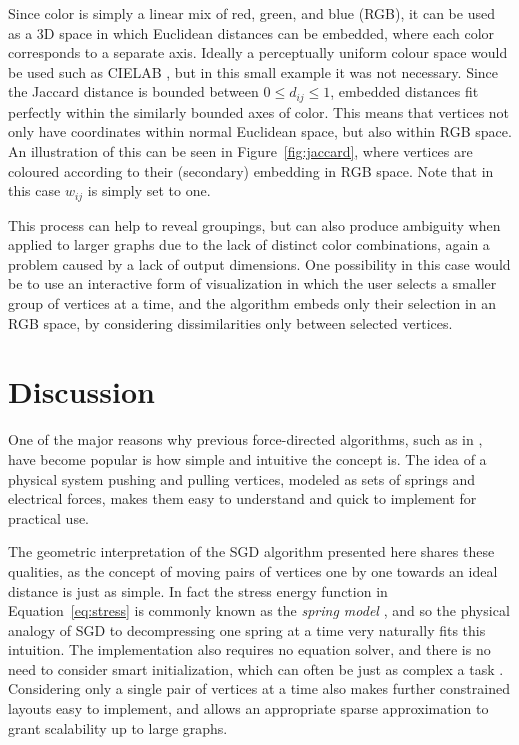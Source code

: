 Since color is simply a linear mix of red, green, and blue (RGB), it can be used as a 3D space in which Euclidean distances can be embedded, where each color corresponds to a separate axis. Ideally a perceptually uniform colour space would be used such as CIELAB \cite{Smart2019}, but in this small example it was not necessary.
Since the Jaccard distance is bounded between $0\leq d_{ij}\leq 1$, embedded distances fit perfectly within the similarly bounded axes of color. This means that vertices not only have coordinates within normal Euclidean space, but also within RGB space. 
An illustration of this can be seen in Figure~\ref{fig:jaccard}, where vertices are coloured according to their (secondary) embedding in RGB space. Note that in this case $w_{ij}$ is simply set to one.

This process can help to reveal groupings, but can also produce ambiguity when applied to larger graphs due to the lack of distinct color combinations, again a problem caused by a lack of output dimensions. One possibility in this case would be to use an interactive form of visualization in which the user selects a smaller group of vertices at a time, and the algorithm embeds only their selection in an RGB space, by considering dissimilarities only between selected vertices.

\section{Discussion}
One of the major reasons why previous force-directed algorithms, such as in \cite{Eades1984,Kamada1989,Fruchterman1991,Frick1995},
have become popular is how simple and intuitive the concept is. The idea of a physical system pushing and pulling vertices, modeled as sets of springs and electrical forces, makes them easy to understand and quick to implement for practical use.

The geometric interpretation of the SGD algorithm presented here shares these qualities, as the concept of moving pairs of vertices one by one towards an ideal distance is just as simple.
In fact the stress energy function in Equation~\eqref{eq:stress} is commonly known as the \emph{spring model} \cite{Kamada1989,Hu2005}, and so the physical analogy of SGD to decompressing one spring at a time very naturally fits this intuition.
The implementation also requires no equation solver, and there is no need to consider smart initialization, which can often be just as complex a task \cite{Brandes2008}.
Considering only a single pair of vertices at a time also makes further constrained layouts easy to implement, and allows an appropriate sparse approximation to grant scalability up to large graphs.

